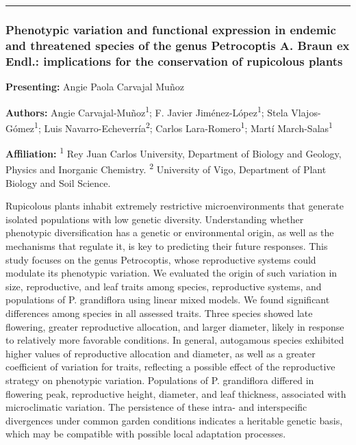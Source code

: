 \documentclass[
  letterpaper,
  DIV=11,
  numbers=noendperiod]{scrartcl}
\begin{document}
\begin{center}\rule{0.5\linewidth}{0.5pt}\end{center}

\subsubsection{Phenotypic variation and functional expression in endemic
and threatened species of the genus Petrocoptis A. Braun ex Endl.:
implications for the conservation of rupicolous
plants}\label{phenotypic-variation-and-functional-expression-in-endemic-and-threatened-species-of-the-genus-petrocoptis-a.-braun-ex-endl.-implications-for-the-conservation-of-rupicolous-plants}

\textbf{Presenting:} Angie Paola Carvajal Muñoz

\textbf{Authors:} Angie Carvajal-Muñoz\textsuperscript{1}; F. Javier
Jiménez-López\textsuperscript{1}; Stela Vlajos-Gómez\textsuperscript{1};
Luis Navarro-Echeverría\textsuperscript{2}; Carlos
Lara-Romero\textsuperscript{1}; Martí March-Salas\textsuperscript{1}

\textbf{Affiliation:} \textsuperscript{1} Rey Juan Carlos University,
Department of Biology and Geology, Physics and Inorganic Chemistry.
\textsuperscript{2} University of Vigo, Department of Plant Biology and
Soil Science.

Rupicolous plants inhabit extremely restrictive microenvironments that
generate isolated populations with low genetic diversity. Understanding
whether phenotypic diversification has a genetic or environmental
origin, as well as the mechanisms that regulate it, is key to predicting
their future responses. This study focuses on the genus Petrocoptis,
whose reproductive systems could modulate its phenotypic variation. We
evaluated the origin of such variation in size, reproductive, and leaf
traits among species, reproductive systems, and populations of P.
grandiflora using linear mixed models. We found significant differences
among species in all assessed traits. Three species showed late
flowering, greater reproductive allocation, and larger diameter, likely
in response to relatively more favorable conditions. In general,
autogamous species exhibited higher values of reproductive allocation
and diameter, as well as a greater coefficient of variation for traits,
reflecting a possible effect of the reproductive strategy on phenotypic
variation. Populations of P. grandiflora differed in flowering peak,
reproductive height, diameter, and leaf thickness, associated with
microclimatic variation. The persistence of these intra- and
interspecific divergences under common garden conditions indicates a
heritable genetic basis, which may be compatible with possible local
adaptation processes.
\end{document}
